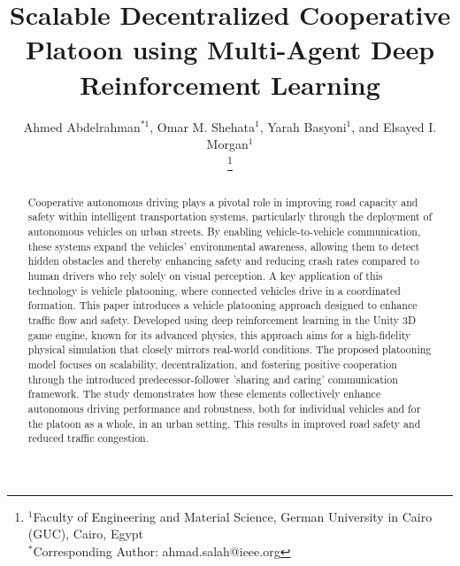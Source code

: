 \documentclass[lettersize,journal]{IEEEtran}
\begin{document}
\title{Scalable Decentralized Cooperative Platoon using Multi-Agent Deep Reinforcement Learning}

\author{Ahmed Abdelrahman$^{*1}$, Omar M. Shehata$^{1}$, Yarah Basyoni$^{1}$, and Elsayed I. Morgan$^{1}$%

\thanks{$^{1}$Faculty of Engineering and Material Science, German University in Cairo (GUC), Cairo, Egypt\\
$^{*}$Corresponding Author: ahmad.salah@ieee.org}

}



\maketitle

\begin{abstract}
Cooperative autonomous driving plays a pivotal role in improving road capacity and safety within intelligent transportation systems, particularly through the deployment of autonomous vehicles on urban streets. By enabling vehicle-to-vehicle communication, these systems expand the vehicles' environmental awareness, allowing them to detect hidden obstacles and thereby enhancing safety and reducing crash rates compared to human drivers who rely solely on visual perception. A key application of this technology is vehicle platooning, where connected vehicles drive in a coordinated formation. This paper introduces a vehicle platooning approach designed to enhance traffic flow and safety. Developed using deep reinforcement learning in the Unity 3D game engine, known for its advanced physics, this approach aims for a high-fidelity physical simulation that closely mirrors real-world conditions. The proposed platooning model focuses on scalability, decentralization, and fostering positive cooperation through the introduced predecessor-follower 'sharing and caring' communication framework. The study demonstrates how these elements collectively enhance autonomous driving performance and robustness, both for individual vehicles and for the platoon as a whole, in an urban setting. This results in improved road safety and reduced traffic congestion.

\end{abstract}
\end{document}
